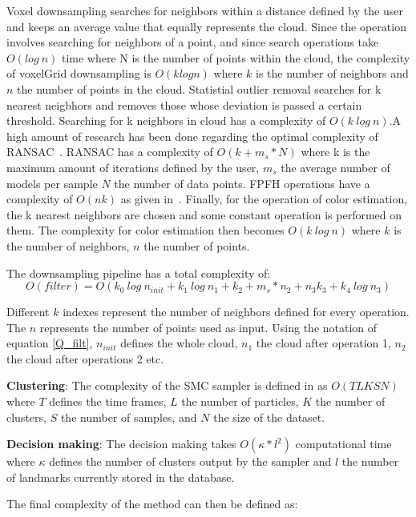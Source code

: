 \documentclass[]{article}
\begin{document}
    Voxel downsampling searches for neighbors within a distance defined by the user and keeps an average value that equally represents the cloud. Since the operation involves searching for neighbors of a point, and since search operations take $O(log\ n)$ time where N is the number of points within the cloud, the complexity of voxelGrid downsampling is $O(k log n)$ where $k$ is the number of neighbors and $n$ the number of points in the cloud.
    Statistial outlier removal searches for k nearest neigbhors and removes those whose deviation is passed a certain threshold. Searching for k neighbors in cloud has a complexity of $O(k\ log\ n)$.A high amount of research has been done regarding the optimal complexity of RANSAC~\cite{RANSAC}. RANSAC has a complexity of $ O(k+ m_s*N)$ where k is the maximum amount of iterations defined by the user, $m_s$ the average number of models per sample $N$ the number of data points.
    FPFH operations have a complexity of $O(nk)$ as given in~\cite{fpfh}.
    Finally, for the operation of color estimation, the k nearest neighbors are chosen and some constant operation is performed on them. The complexity for color estimation then becomes $O(k\ log\ n)$ where $k$ is the number of neighbors, $n$ the number of points. 

    The downsampling pipeline has a total complexity of:
    \begin{equation} \label{Q_filt}
        O(filter) = O(k_{0}\ log\ n_{init} + k_{1}\ log\ n_{1} + k_{2}+ m_s*n_{2} + n_{3}k_{3} + k_{4}\ log\ n_{3} )
    \end{equation}

    Different $k$ indexes represent the number of neighbors defined for every operation. The $n$ represents the number of points used as input. Using the notation  of equation \ref{Q_filt}, $n_{init}$ defines the whole cloud, $n_1$ the cloud after operation 1, $n_2$ the cloud after operations 2 etc.

    \textbf{Clustering}: The complexity of the SMC sampler is defined in \cite{smcddp} as $O(TLKSN)$ where $T$ defines the time frames, $L$ the number of particles, $K$ the number of clusters, $S$ the number of samples, and $N$ the size of the dataset. 

    \textbf{Decision making}: The decision making takes $ O(\kappa * l^2) $ computational time where $\kappa$ defines the number of clusters output by the sampler and $l$ the number of landmarks currently stored in the database.

    The final complexity of the method can then be defined as:
\end{document}
